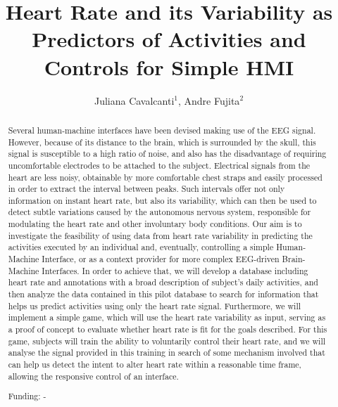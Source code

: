 \documentclass[twoside]{article}
\title{\vspace{-15mm}\fontsize{24pt}{10pt}\selectfont\textbf{Heart Rate and its Variability as Predictors of Activities and Controls for Simple HMI}} %
\author{Juliana Cavalcanti$^1$, Andre Fujita$^2$}
\affil{1 USP\\ 2 IME - USP\\ }
\date{}
\begin{document}
\maketitle %

\thispagestyle{fancy} %


\begin{abstract}
Several human-machine interfaces have been devised making use of the EEG signal. However, because of its distance to the brain, which is surrounded by the skull, this signal is susceptible to a high ratio of noise, and also has the disadvantage of requiring uncomfortable electrodes to be attached to the subject.  Electrical signals from the heart are less noisy, obtainable by more comfortable chest straps and easily processed in order to extract the interval between peaks. Such intervals offer not only information on instant heart rate, but also its variability, which can then be used to detect subtle variations caused by the autonomous nervous system, responsible for modulating the heart rate and other involuntary body conditions. Our aim is to investigate the feasibility of using data from heart rate variability in predicting the activities executed by an individual and, eventually, controlling a simple Human-Machine Interface, or as a context provider for more complex EEG-driven Brain-Machine Interfaces.
In order to achieve that, we will develop a database including heart rate and annotations with a broad description of subject's daily activities, and then analyze the data contained in this pilot database to search for information that helps us predict activities using only the heart rate signal. Furthermore, we will implement a simple game, which will use the heart rate variability as input, serving as a proof of concept to evaluate whether heart rate is fit for the goals described. For this game, subjects will train the ability to voluntarily control  their heart rate, and we will analyse the signal provided in this training in search of some mechanism involved that can help us detect the intent to alter heart rate within a reasonable time frame,  allowing the responsive control of an interface.

Funding: -
\end{abstract}
\end{document}
